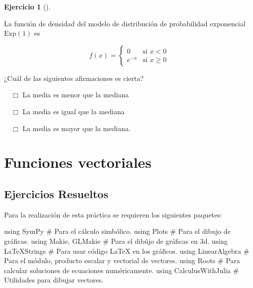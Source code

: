\documentclass[
  a4paper,
]{scrreport}
\newenvironment{Shaded}{\begin{snugshade}}{\end{snugshade}}
\newcommand{\BuiltInTok}[1]{\textcolor[rgb]{0.00,0.23,0.31}{#1}}
\newcommand{\CommentTok}[1]{\textcolor[rgb]{0.37,0.37,0.37}{#1}}
\newcommand{\ImportTok}[1]{\textcolor[rgb]{0.00,0.46,0.62}{#1}}
\newcommand{\NormalTok}[1]{\textcolor[rgb]{0.00,0.23,0.31}{#1}}
\theoremstyle{definition}
\newtheorem{exercise}{Ejercicio}[chapter]
\theoremstyle{remark}
\begin{document}
\begin{exercise}[]\protect\hypertarget{exr-integrales-propuesto-8}{}\label{exr-integrales-propuesto-8}

La función de densidad del modelo de distribución de probabilidad
exponencial \(\mbox{Exp}(1)\) es

\[
f(x)=
\begin{cases}
0 & \mbox{si $x<0$}\\
e^{-x} & \mbox{si $x\geq 0$}
\end{cases}
\]

¿Cuál de las siguientes afirmaciones es cierta?

${\quad\Box}$ La media es menor que la mediana

${\quad\Box}$ La media es igual que la mediana

${\quad\Box}$ La media es mayor que la mediana.

\end{exercise}


\hypertarget{funciones-vectoriales}{%
\chapter{Funciones vectoriales}\label{funciones-vectoriales}}

\hypertarget{ejercicios-resueltos-6}{%
\section{Ejercicios Resueltos}\label{ejercicios-resueltos-6}}

Para la realización de esta práctica se requieren los siguientes
paquetes:

\begin{Shaded}
\begin{Highlighting}[]
\ImportTok{using} \BuiltInTok{SymPy  }\CommentTok{\# Para el cálculo simbólico.}
\ImportTok{using} \BuiltInTok{Plots  }\CommentTok{\# Para el dibujo de gráficas.}
\ImportTok{using} \BuiltInTok{Makie}\NormalTok{, }\BuiltInTok{GLMakie }\CommentTok{\# Para el dibújo de gráficas en 3d.}
\ImportTok{using} \BuiltInTok{LaTeXStrings  }\CommentTok{\# Para usar código LaTeX en los gráficos.}
\ImportTok{using} \BuiltInTok{LinearAlgebra }\CommentTok{\# Para el módulo, producto escalar y vectorial de vectores.}
\ImportTok{using} \BuiltInTok{Roots }\CommentTok{\# Para calcular soluciones de ecuaciones numéricamente.}
\ImportTok{using} \BuiltInTok{CalculusWithJulia }\CommentTok{\# Utilidades para dibujar vectores.}
\end{Highlighting}
\end{Shaded}
\end{document}
